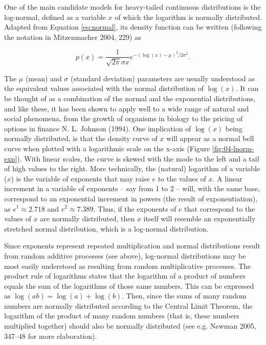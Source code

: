 \documentclass[
  12pt,
  a4paper, twoside]{book}
\begin{document}
One of the main candidate models for heavy-tailed continuous distributions is the log-normal, defined as a variable \(x\) of which the logarithm is normally distributed. Adapted from Equation \eqref{eq:normal}, its density function can be written (following the notation in Mitzenmacher 2004, 229) as

\begin{equation}
p(x)=\frac{1}{\sqrt{2\pi}\sigma x}e^{-(\log(x)-\mu)^2/2\sigma^2}.
\label{eq:log-normal}
\end{equation}

The \(\mu\) (mean) and \(\sigma\) (standard deviation) parameters are usually understood as the equivalent values associated with the normal distribution of \(\log(x)\). It can be thought of as a combination of the normal and the exponential distributions, and like these, it has been shown to apply well to a wide range of natural and social phenomena, from the growth of organisms in biology to the pricing of options in finance N. L. Johnson (1994). One implication of \(\log (x)\) being normally distributed, is that the density curve of \(x\) will appear as a normal bell curve when plotted with a logarithmic scale on the x-axis (Figure \ref{fig:04-lnorm-exp}). With linear scales, the curve is skewed with the mode to the left and a tail of high values to the right. More technically, the (natural) logarithm of a variable (\(x\)) is the variable of exponents that may raise \(e\) to the values of \(x\). A linear increment in a variable of exponents -- say from 1 to 2 -- will, with the same base, correspond to an exponential increment in powers (the result of exponentiation), as \(e^1 \approx 2.718\) and \(e^2 \approx 7.389\). Thus, if the exponents of \(e\) that correspond to the values of \(x\) are normally distributed, then \(x\) itself will resemble an exponentially stretched normal distribution, which is a log-normal distribution.

Since exponents represent repeated multiplication and normal distributions result from random additive processes (see above), log-normal distributions may be most easily understood as resulting from random multiplicative processes. The product rule of logarithms states that the logarithm of a product of numbers equals the sum of the logarithms of those same numbers. This can be expressed as \(\log (ab) = \log (a) + \log (b)\). Then, since the sums of many random numbers are normally distributed according to the Central Limit Theorem, the logarithm of the product of many random numbers (that is, these numbers multiplied together) should also be normally distributed (see e.g. Newman 2005, 347--48 for more elaboration).
\end{document}
